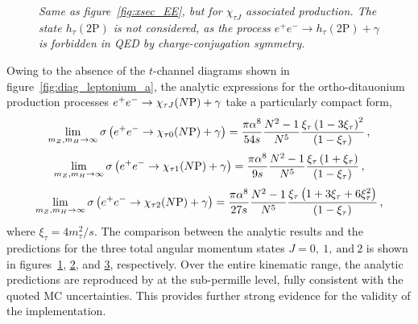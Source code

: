 \begin{figure}[t]
    \centering
    \begin{subfigure}[b]{0.49\textwidth}
        
        \caption{}
        \label{fig:xsec_TT_a}
    \end{subfigure}
    \begin{subfigure}[b]{0.49\textwidth}
        
        \caption{}
        \label{fig:xsec_TT_b}
    \end{subfigure}
    \begin{subfigure}[b]{0.49\textwidth}
        
        \caption{}
        \label{fig:xsec_TT_c}
    \end{subfigure}
    \caption{\small\it Same as figure~\ref{fig:xsec_EE}, but for $\chi_{\tau J}$ associated production. The state $h_{\tau}(2\mathrm{P})$ is not considered, as the process $e^+e^-\to h_{\tau}(2\mathrm{P})+\gamma$ is forbidden in QED by charge-conjugation symmetry.}
    \label{fig:xsec_TT}
\end{figure}

Owing to the absence of the $t$-channel diagrams shown in figure~\ref{fig:diag_leptonium_a}, the analytic expressions for the ortho-ditauonium production processes $e^+e^-\to\chi_{\tau J}(N\mathrm{P})+\gamma$ take a particularly compact form,
\begin{equation}
    \lim_{m_Z,m_H\to\infty}\sigma\left(e^+e^-\to\chi_{\tau 0}(N\mathrm{P})+\gamma\right) = \dfrac{\pi\alpha^8}{54s}\dfrac{N^2-1}{N^5}\dfrac{\xi_\tau\left(1-3\xi_\tau\right)^2}{(1-\xi_\tau)}\,,
\end{equation}
\begin{equation}
    \lim_{m_Z,m_H\to\infty}\sigma\left(e^+e^-\to\chi_{\tau 1}(N\mathrm{P})+\gamma\right) = \dfrac{\pi\alpha^8}{9s}\dfrac{N^2-1}{N^5}\dfrac{\xi_\tau\left(1+\xi_\tau\right)}{(1-\xi_\tau)}\,,
\end{equation}
\begin{equation}
    \lim_{m_Z,m_H\to\infty}\sigma\left(e^+e^-\to\chi_{\tau 2}(N\mathrm{P})+\gamma\right) = \dfrac{\pi\alpha^8}{27s}\dfrac{N^2-1}{N^5}\dfrac{\xi_\tau\left(1+3 \xi_\tau+6\xi_\tau^2\right)}{(1-\xi_\tau)}\,,
\end{equation}
where $\xi_\tau = 4m_\tau^2/s$. The comparison between the analytic results and the \mgshort{} predictions for the three total angular momentum states $J=0,\ 1,\ \text{and}\ 2$ is shown in figures~\ref{fig:xsec_TT_a}, \ref{fig:xsec_TT_b}, and \ref{fig:xsec_TT_c}, respectively.
Over the entire kinematic range, the analytic predictions are reproduced by \mgshort{} at the sub-permille level, fully consistent with the quoted MC uncertainties. This provides further strong evidence for the validity of the implementation.

